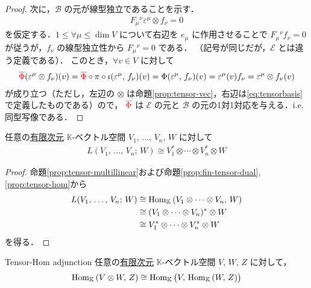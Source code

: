 \documentclass[rep_main]{subfiles}
\begin{document}
\begin{proof}
{        次に，$\mathcal{B}$ の元が線型独立であることを示す．
        \begin{align}
            F_{\mu}{}^\nu \varepsilon^\mu \otimes f_\nu = 0
        \end{align}
        を仮定する．$1 \le \forall \mu \le \dim V$ について右辺を $e_\mu$ に作用させることで $F_\mu{}^\nu f_\nu = 0$ が従うが，$f_\nu$ の線型独立性から $F_{\mu}{}^\nu = 0$ である．
    }
    （記号が同じだが，$\mathcal{E}$ とは違う定義である）．
	このとき，$\forall v \in V$ に対して
	\begin{align}
		\textcolor{red}{\overline{\Phi}}(\varepsilon^\mu \otimes f_\nu )(v) = \textcolor{red}{\overline{\Phi}} \circ \pi \circ \iota(\varepsilon^\mu,\, f_\nu )(v) = \Phi(\varepsilon^\mu,\, f_\nu)(v) = \varepsilon^\mu (v) f_\nu = \varepsilon^\mu \otimes f_\nu(v)
	\end{align}
	が成り立つ（ただし，左辺の $\otimes$ は命題\ref{prop:tensor-vec}，右辺は\eqref{eq:tensorbasis}で定義したものである）ので，
	$\textcolor{red}{\overline{\Phi}}$ は $\mathcal{E}$ の元と $\mathcal{B}$ の元の1対1対応を与える．i.e. 同型写像である．
\end{proof}


\begin{mycol}[label=col:tensor-multillinear]{}
    任意の\underline{有限次元} $\mathbb{K}$-ベクトル空間 $V_1,\, \dots,\, V_n,\, W$ に対して
    \begin{align}
        L(V_1,\, \dots,\, V_n;\, W) \cong V_1^* \otimes \cdots \otimes V_n^* \otimes W
    \end{align}
\end{mycol}

\begin{proof}
    命題\ref{prop:tensor-multillinear}および命題\ref{prop:fin-tensor-dual}, \ref{prop:tensor-hom}から
    \begin{align}
        L(V_1,\, \dots,\, V_n;\, W) 
        &\cong \mathrm{Hom}_{\mathbb{K}} \mathop{}(V_1 \otimes \cdots \otimes V_n,\, W) \\
        &\cong (V_1 \otimes \cdots \otimes V_n)^* \otimes W \\
        &\cong V_1^* \otimes \cdots \otimes V_n^* \otimes W
    \end{align}
    を得る．
\end{proof}

\begin{mycol}[label=col:tensor-hom-adj]{Tensor-Hom adjunction}
    任意の\underline{有限次元} $\mathbb{K}$-ベクトル空間 $V,\, W,\, Z$ に対して，
    \begin{align}
        \mathrm{Hom}_{\mathbb{K}} \mathop{} (V \otimes W,\, Z) \cong \mathrm{Hom}_{\mathbb{K}} \mathop{} \bigl( V,\, \mathrm{Hom}_{\mathbb{K}} \mathop{} (W,\, Z) \bigr) 
    \end{align}
\end{mycol}
\end{document}
